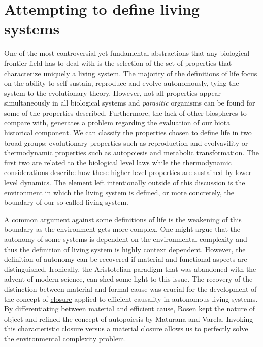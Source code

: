 \documentclass[aps,twocolumn]{revtex4-1}
\begin{document}
\section{Attempting to define living systems}

One of the most controversial yet fundamental abstractions that any biological frontier field has to deal with is the selection of the set of properties that characterize uniquely a living system. The majority of the definitions of life focus on the ability to self-sustain, reproduce and evolve autonomously, tying the system to the evolutionary theory. However, not all properties appear simultaneously in all biological systems and \textit{parasitic} organisms can be found for some of the properties described. Furthermore, the lack of other biospheres to compare with, generates a problem regarding the evaluation of our biota historical component. We can classify the properties chosen to define life in two broad groups; evolutionary properties such as reproduction and evolvavility or thermodynamic properties such as autopoiesis and metabolic transformation. The first two are related to the biological level laws while the thermodynamic considerations describe how these higher level properties are sustained by lower level dynamics. The element left intentionally outside of this discussion is the environment in which the living system is defined, or more concretely, the boundary of our so called living system. 

A common argument against some definitions of life is the weakening of this boundary as the environment gets more complex. One might argue that the autonomy of some systems is dependent on the environmental complexity and thus the definition of living system is highly context dependent. However, the definition of autonomy can be recovered if material and functional aspects are distinguished. Ironically, the Aristotelian paradigm that was abandoned with the advent of modern science, can shed some light to this issue. The recovery of the distinction between material and formal cause was crucial for the development of the concept of \href{http://en.wikipedia.org/wiki/Closure_(mathematics)}{closure} applied to efficient causality in autonomous living systems. By differentiating between material and efficient cause, Rosen kept the nature of object and refined the concept of autopoiesis by Maturana and Varela. Invoking this characteristic closure versus a material closure allows us to perfectly solve the environmental complexity problem. 
\end{document}
